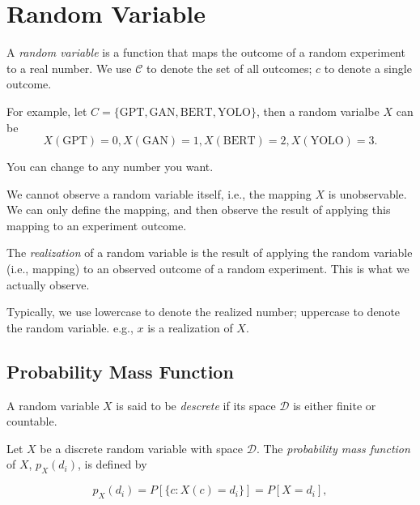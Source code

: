 \documentclass{article}
\begin{document}
    \section*{Random Variable}

        A \textit{random variable} is a function that maps the outcome of a
        random experiment to a real number. We use $ \mathcal{C} $ to
        denote the set of all outcomes; $ c $ to denote a single outcome.

        For example, let $ C =  \{ \text{GPT}, \text{GAN}, \text{BERT},
        \text{YOLO} \} $, then a random varialbe $ X $ can be
        \begin{equation*}
             X(\text{GPT}) = 0, X(\text{GAN}) = 1, X(\text{BERT}) = 2,
             X(\text{YOLO}) = 3.
        \end{equation*}

        You can change to any number you want.

        We cannot observe a random variable itself, i.e., the mapping $ X $
        is unobservable. We can only define the mapping, and then observe
        the result of applying this mapping to an experiment outcome.

        The \textit{realization} of a random variable is the result of
        applying the random variable (i.e., mapping) to an observed outcome
        of a random experiment. This is what we actually observe.

        Typically, we use lowercase to denote the realized number;
        uppercase to denote the random variable. e.g., $ x $ is a
        realization of $ X $.

        \subsection*{Probability Mass Function}

            A random variable $ X $ is said to be \textit{descrete} if its
            space $ \mathcal{D} $ is either finite or countable.

            Let $ X $ be a discrete random variable with space $ \mathcal{D} $.
            The \textit{probability mass function} of $ X $, $ p_{X}(d_{i}) $,
            is defined by

            \begin{equation*}
                p_{X}(d_{i}) = P[\{ c: X(c) = d_{i} \}] = P[ X = d_{i} ],
            \end{equation*}
\end{document}
